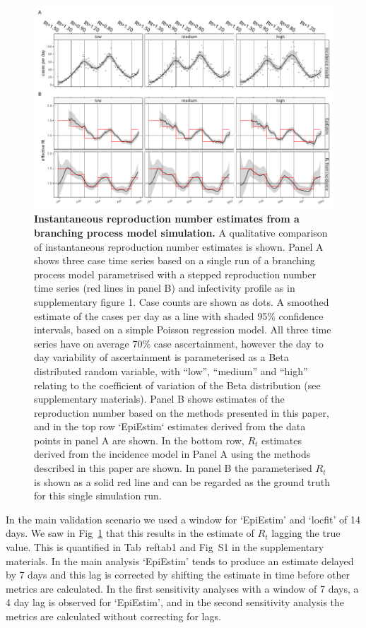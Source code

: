 \documentclass[10pt,letterpaper]{article}
\begin{document}
\begin{figure}[!ht]
\centerline{\includegraphics{fig/fig1-noise-qualitative}}
\caption{{\bf Instantaneous reproduction number estimates from a branching process model simulation.}
A qualitative comparison of instantaneous reproduction number estimates is shown. Panel A shows three case time series based on a single run of a branching process model parametrised with a stepped reproduction number time series (red lines in panel B) and infectivity profile as in supplementary figure 1. Case counts are shown as dots. A smoothed estimate of the cases per day as a line with shaded 95\% confidence intervals, based on a simple Poisson regression model. All three time series have on average 70\% case ascertainment, however the day to day variability of ascertainment is parameterised as a Beta distributed random variable, with ``low'', ``medium'' and ``high'' relating to the coefficient of variation of the Beta distribution (see supplementary materials). Panel B shows estimates of the reproduction number based on the methods presented in this paper, and in the top row `EpiEstim` estimates derived from the data points in panel A are shown. In the bottom row, $R_t$ estimates derived from the incidence model in Panel A using the methods described in this paper are shown. In panel B the parameterised $R_t$ is shown as a solid red line and can be regarded as the ground truth for this single simulation run.}
\label{fig1}
\end{figure}

In the main validation scenario we used a window for `EpiEstim' and `locfit' of 14 days. We saw in Fig~\ref{fig1} that this results in the estimate of $R_t$ lagging the true value. This is quantified in Tab~ref{tab1} and Fig~S1 in the supplementary materials. In the main analysis `EpiEstim' tends to produce an estimate delayed by 7 days and this lag is corrected by shifting the estimate in time before other metrics are calculated. In the first sensitivity analyses with a window of 7 days, a 4 day lag is observed for `EpiEstim', and in the second sensitivity analysis the metrics are calculated without correcting for lags.
\end{document}
